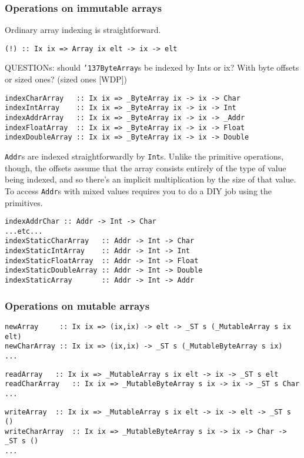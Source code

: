 \subsubsection{Operations on immutable arrays}

Ordinary array indexing is straightforward.
\begin{verbatim}
(!) :: Ix ix => Array ix elt -> ix -> elt
\end{verbatim}
QUESTIONs: should \mbox{\tt {\char'137}ByteArray}s be indexed by Ints or ix?  With byte offsets
or sized ones? (sized ones [WDP])
\begin{verbatim}
indexCharArray   :: Ix ix => _ByteArray ix -> ix -> Char
indexIntArray    :: Ix ix => _ByteArray ix -> ix -> Int
indexAddrArray   :: Ix ix => _ByteArray ix -> ix -> _Addr
indexFloatArray  :: Ix ix => _ByteArray ix -> ix -> Float
indexDoubleArray :: Ix ix => _ByteArray ix -> ix -> Double
\end{verbatim}
\mbox{\tt Addr}s are indexed straightforwardly by \mbox{\tt Int}s.  Unlike the primitive
operations, though, the offsets assume that the array consists entirely of the
type of value being indexed, and so there's an implicit multiplication by
the size of that value.  To access \mbox{\tt Addr}s with mixed values requires
you to do a DIY job using the primitives.
\begin{verbatim}
indexAddrChar :: Addr -> Int -> Char
...etc...
indexStaticCharArray   :: Addr -> Int -> Char
indexStaticIntArray    :: Addr -> Int -> Int
indexStaticFloatArray  :: Addr -> Int -> Float
indexStaticDoubleArray :: Addr -> Int -> Double
indexStaticArray       :: Addr -> Int -> Addr
\end{verbatim}

\subsubsection{Operations on mutable arrays}
\begin{verbatim}
newArray     :: Ix ix => (ix,ix) -> elt -> _ST s (_MutableArray s ix elt)
newCharArray :: Ix ix => (ix,ix) -> _ST s (_MutableByteArray s ix) 
...
\end{verbatim}

\begin{verbatim}
readArray   :: Ix ix => _MutableArray s ix elt -> ix -> _ST s elt 
readCharArray   :: Ix ix => _MutableByteArray s ix -> ix -> _ST s Char 
...
\end{verbatim}

\begin{verbatim}
writeArray  :: Ix ix => _MutableArray s ix elt -> ix -> elt -> _ST s () 
writeCharArray  :: Ix ix => _MutableByteArray s ix -> ix -> Char -> _ST s () 
...
\end{verbatim}

